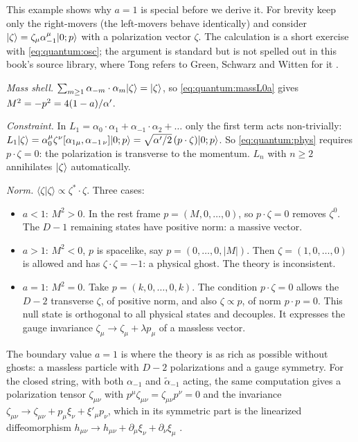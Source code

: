 \begin{example}\label{ex:quantum:level1}
This example shows why $a=1$ is special before we derive it. For brevity keep only the
right-movers (the left-movers behave identically) and consider
$|\zeta\rangle=\zeta_\mu\alpha^\mu_{-1}|0;p\rangle$ with a polarization vector $\zeta$. The
calculation is a short exercise with \cref{eq:quantum:osc}; the argument is standard but is
not spelled out in this book's source library, where Tong refers to Green, Schwarz and
Witten for it .

\emph{Mass shell.} $\sum_{m\ge1}\alpha_{-m}\cdot\alpha_m|\zeta\rangle=|\zeta\rangle$, so
\cref{eq:quantum:massL0a} gives $M^2=-p^2=4(1-a)/\alpha'$.

\emph{Constraint.} In $L_1=\alpha_0\cdot\alpha_1+\alpha_{-1}\cdot\alpha_2+\dots$ only the first
term acts non-trivially:
$L_1|\zeta\rangle=\alpha_0^\mu\zeta^\nu[\alpha_{1\mu},\alpha_{-1\,\nu}]|0;p\rangle
=\sqrt{\alpha'/2}\,(p\cdot\zeta)|0;p\rangle$. So \cref{eq:quantum:phys} requires $p\cdot\zeta=0$: the
polarization is transverse to the momentum. $L_n$ with $n\ge2$ annihilates $|\zeta\rangle$
automatically.

\emph{Norm.} $\langle\zeta|\zeta\rangle\propto\zeta^*\cdot\zeta$. Three cases:
\begin{itemize}[leftmargin=*]
\item $a<1$: $M^2>0$. In the rest frame $p=(M,0,\dots,0)$, so $p\cdot\zeta=0$ removes
$\zeta^0$. The $D-1$ remaining states have positive norm: a massive vector.
\item $a>1$: $M^2<0$, $p$ is spacelike, say $p=(0,\dots,0,|M|)$. Then $\zeta=(1,0,\dots,0)$
is allowed and has $\zeta\cdot\zeta=-1$: a physical ghost. The theory is inconsistent.
\item $a=1$: $M^2=0$. Take $p=(k,0,\dots,0,k)$. The condition $p\cdot\zeta=0$ allows the
$D-2$ transverse $\zeta$, of positive norm, and also $\zeta\propto p$, of norm
$p\cdot p=0$. This null state is orthogonal to all physical states and decouples. It
expresses the gauge invariance $\zeta_\mu\to\zeta_\mu+\lambda p_\mu$ of a massless vector.
\end{itemize}
The boundary value $a=1$ is where the theory is as rich as possible without ghosts: a massless
particle with $D-2$ polarizations and a gauge symmetry. For the closed string, with both
$\alpha_{-1}$ and $\tilde\alpha_{-1}$ acting, the same computation gives a polarization tensor
$\zeta_{\mu\nu}$ with $p^\mu\zeta_{\mu\nu}=\zeta_{\mu\nu}p^\nu=0$ and the invariance
$\zeta_{\mu\nu}\to\zeta_{\mu\nu}+p_\mu\xi_\nu+\xi'_\mu p_\nu$, which in its symmetric part is
the linearized diffeomorphism $h_{\mu\nu}\to h_{\mu\nu}+\partial_\mu\xi_\nu+\partial_\nu\xi_\mu$
.
\end{example}


